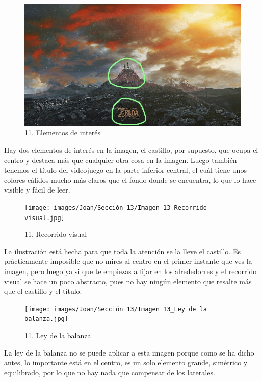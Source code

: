 \documentclass[12pt]{article}
\begin{document}
        \begin{figure}[H]
          \centering
          \includegraphics[scale=0.35]{images/Joan/Sección 13/Imagen 13_Elementos de interés.jpg}
          \caption{\small 11. Elementos de interés}
        \end{figure}
        Hay dos elementos de interés en la imagen, el castillo, por supuesto, que ocupa el centro y destaca más que cualquier otra cosa en la imagen. Luego también tenemos el título del videojuego en la parte inferior central, el cuál tiene unos colores cálidos mucho más claros que el fondo donde se encuentra, lo que lo hace visible y fácil de leer. 

        \begin{figure}[H]
          \centering
          \texttt{[image: images/Joan/Sección 13/Imagen 13\_Recorrido visual.jpg]}
          \caption{\small 11. Recorrido visual}
        \end{figure}
        La ilustración está hecha para que toda la atención se la lleve el castillo. Es prácticamente imposible que no mires al centro en el primer instante que ves la imagen, pero luego ya si que te empiezas a fijar en los alrededorres y el recorrido visual se hace un poco abstracto, pues no hay ningún elemento que resalte más que el castillo y el título. 

    \begin{figure}[H]
          \centering
          \texttt{[image: images/Joan/Sección 13/Imagen 13\_Ley de la balanza.jpg]}
          \caption{\small 11. Ley de la balanza}
        \end{figure}
        La ley de la balanza no se puede aplicar a esta imagen porque como se ha dicho antes, lo importante está en el centro, es un solo elemento grande, simétrico y equilibrado, por lo que no hay nada que compensar de los laterales. 
\end{document}
